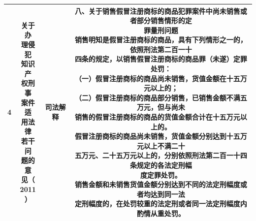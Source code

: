 \documentclass[
    a4paper
    ]{ctexart}
\begin{document}
{{\begin{longtable}{|c|c|c|c|}
                4 & \makecell[l]{关于办\\理侵犯\\知识产\\权刑事\\案件适\\用法律\\若干问\\题的意\\见（\\2011\\）} & 司法解释 & 
                \makecell[l]{
                    八、关于销售假冒注册商标的商品犯罪案件中尚未销售或者部分销售情形的定\\
                    罪量刑问题\\
                    销售明知是假冒注册商标的商品，具有下列情形之一的，依照刑法第二百一十\\
                    四条的规定，以销售假冒注册商标的商品罪（未遂）定罪处罚：\\
                    \qquad （一）假冒注册商标的商品尚未销售，货值金额在十五万元以上的；\\
                    \qquad （二）假冒注册商标的商品部分销售，已销售金额不满五万元，但与尚未\\
                    销售的假冒注册商标的商品的货值金额合计在十五万元以上的。\\
                    \qquad 假冒注册商标的商品尚未销售，货值金额分别达到十五万元以上不满二十\\
                    五万元、二十五万元以上的，分别依照刑法第二百一十四条规定的各法定刑幅\\
                    度定罪处罚。\\
                    \qquad 销售金额和未销售货值金额分别达到不同的法定刑幅度或者均达到同一法\\
                    定刑幅度的，在处罚较重的法定刑或者同一法定刑幅度内酌情从重处罚。
                    } \\
                    \hline
 

\end{longtable}}}
\end{document}
